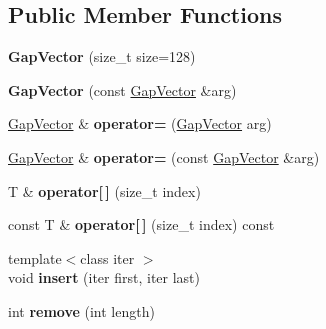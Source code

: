 \subsection*{Public Member Functions}
\begin{DoxyCompactItemize}
\item 
\hypertarget{classSDNB_1_1GapVector_ae2017ba1405b81d73fa8db9a53fd475d}{}{\bfseries Gap\+Vector} (size\+\_\+t size=128)\label{classSDNB_1_1GapVector_ae2017ba1405b81d73fa8db9a53fd475d}

\item 
\hypertarget{classSDNB_1_1GapVector_adc12d325e3d9473e959ad57031a413ff}{}{\bfseries Gap\+Vector} (const \hyperlink{classSDNB_1_1GapVector}{Gap\+Vector} \&arg)\label{classSDNB_1_1GapVector_adc12d325e3d9473e959ad57031a413ff}

\item 
\hypertarget{classSDNB_1_1GapVector_a811a405824301979b0a2cb957834bb39}{}\hyperlink{classSDNB_1_1GapVector}{Gap\+Vector} \& {\bfseries operator=} (\hyperlink{classSDNB_1_1GapVector}{Gap\+Vector} arg)\label{classSDNB_1_1GapVector_a811a405824301979b0a2cb957834bb39}

\item 
\hypertarget{classSDNB_1_1GapVector_a7e3163451ad54ce89a80837b3bdc622d}{}\hyperlink{classSDNB_1_1GapVector}{Gap\+Vector} \& {\bfseries operator=} (const \hyperlink{classSDNB_1_1GapVector}{Gap\+Vector} \&arg)\label{classSDNB_1_1GapVector_a7e3163451ad54ce89a80837b3bdc622d}

\item 
\hypertarget{classSDNB_1_1GapVector_aef1d8380623e93dad6f49ec3dcf6ddfa}{}T \& {\bfseries operator\mbox{[}$\,$\mbox{]}} (size\+\_\+t index)\label{classSDNB_1_1GapVector_aef1d8380623e93dad6f49ec3dcf6ddfa}

\item 
\hypertarget{classSDNB_1_1GapVector_aaf3510f16fa61ef5db2e8b9bb443c218}{}const T \& {\bfseries operator\mbox{[}$\,$\mbox{]}} (size\+\_\+t index) const \label{classSDNB_1_1GapVector_aaf3510f16fa61ef5db2e8b9bb443c218}

\item 
\hypertarget{classSDNB_1_1GapVector_a45a4d64f4094416c853e906e89992a2d}{}{\footnotesize template$<$class iter $>$ }\\void {\bfseries insert} (iter first, iter last)\label{classSDNB_1_1GapVector_a45a4d64f4094416c853e906e89992a2d}

\item 
\hypertarget{classSDNB_1_1GapVector_a5165204380dc464053e3ee326e49b81f}{}int {\bfseries remove} (int length)\label{classSDNB_1_1GapVector_a5165204380dc464053e3ee326e49b81f}


\end{DoxyCompactItemize}

